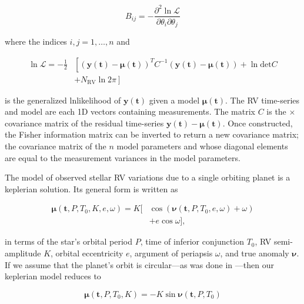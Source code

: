 \begin{equation}
  B_{ij} = - \frac{\partial^2 \ln{\mathcal{L}}}{\partial \theta_i \partial \theta_j}
  \label{eq:fisher}
\end{equation}

\noindent where the indices $i,j=1,\dots,n$ and

\begin{equation}
  \begin{split}
  \ln{\mathcal{L}} = -\frac{1}{2} &\left[(\mathbf{y}(\mathbf{t})-\boldsymbol{\mu}(\mathbf{t}))^T C^{-1} \right.
    (\mathbf{y}(\mathbf{t})-\boldsymbol{\mu}(\mathbf{t})) + \ln{\text{det} C} \\ 
    &+ \left.N_{\text{RV}} \ln{2\pi} \right]
  \end{split}
  \label{eq:lnl}
\end{equation}
  
\noindent is the generalized lnlikelihood of $\mathbf{y}(\mathbf{t})$ given a model
$\boldsymbol{\mu}(\mathbf{t})$. The RV time-series and model are each 1D vectors containing
\nrv{} measurements. The matrix $C$ is the \nrv{} $\times$ \nrv{} covariance matrix of the residual
time-series $\mathbf{y}(\mathbf{t})-\boldsymbol{\mu}(\mathbf{t})$. Once constructed,
the Fisher information matrix can be inverted to return a new covariance matrix; the covariance matrix
of the $n$ model parameters and whose diagonal elements are equal to the measurement variances in the
model parameters.

The model of observed stellar RV variations due to a single orbiting planet is a
keplerian solution. Its general form is written as

\begin{equation}
  \begin{split}
  \boldsymbol{\mu}(\mathbf{t},P,T_0,K,e,\omega) = K [&\cos{(\boldsymbol{\nu}(\mathbf{t},P,T_0,e,\omega)+\omega)} \\
    &+ e\cos{\omega}],
  \end{split}
\end{equation}

\noindent in terms of the star's orbital period $P$, time of inferior conjunction $T_0$,
RV semi-amplitude $K$, orbital eccentricity $e$, argument of periapsis $\omega$, and true anomaly
$\boldsymbol{\nu}$. If we assume that the planet's orbit is circular---as was done in ---then
our keplerian model reduces to

\begin{equation}
  \boldsymbol{\mu}(\mathbf{t},P,T_0,K) = -K \sin{\boldsymbol{\nu}(\mathbf{t},P,T_0)}
  \label{eq:kep}
\end{equation}

